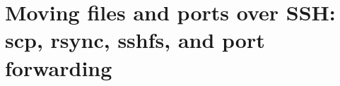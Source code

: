 \chapter{Moving files and ports over SSH: scp, rsync, sshfs, and port forwarding}
\label{ch:moving-files-and-ports-over-ssh-scp}

